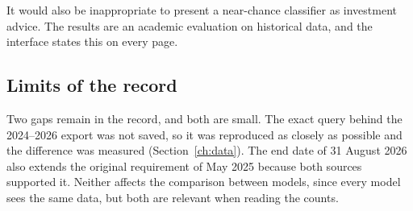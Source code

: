 It would also be inappropriate to present a near-chance classifier as investment advice. The results are an academic evaluation on historical data, and the interface states this on every page.

\subsection{Limits of the record}
Two gaps remain in the record, and both are small. The exact query behind the 2024--2026 export was not saved, so it was reproduced as closely as possible and the difference was measured (Section~\ref{ch:data}). The end date of 31 August 2026 also extends the original requirement of May 2025 because both sources supported it. Neither affects the comparison between models, since every model sees the same data, but both are relevant when reading the counts.
